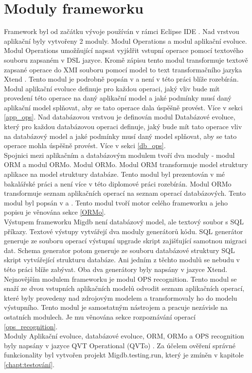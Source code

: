 \documentclass[11pt,twoside,a4paper]{book}
\begin{document}
\section{Moduly frameworku}
Framework byl od začátku vývoje používán v rámci Eclipse IDE
\cite{Eclipse_ide}. Nad vrstvou aplikační byly vytvořeny 2 moduly. Modul
Operations a modul aplikační evoluce.
% 
Modul Operations umožňující napsat vyjídřit vstupní operace pomocí textového
souboru zapsaném v DSL jazyce. Kromě zápisu tento modul transformuje textově
zapsané operace do XMI \cite{XMI} souboru pomocí model to text transformačního
jazyka Xtend \cite{Xtend}. Tento modul je podrobně popsán v
\cite{Mazanec} a není v této práci blíže rozebírán.
% 
Modul aplikační evoluce definuje pro každou operaci, jaký vliv bude mít
provedení této operace na daný aplikační model a jaké podmínky musí daný
aplikační model splňovat, aby se tato operace dala úspěšně provést. Více v
sekci \ref{app_ops}.
% 
Nad databázovou vrstvou je definován modul Databázové evoluce, který pro
každou databázovou operaci definuje, jaký bude mít tato operace vliv na databázový
model a jaké podmínky musí daný model splňovat, aby se tato operace mohla
úspěšně provést. Více v sekci \ref{db_ops}.\\
% 
Spojnici mezi aplikačním a databázovým modulem tvoří dva moduly - modul ORM a
modul ORMo. Modul ORMo.
% 
Modul ORM transformuje model struktury aplikace na model struktury databáze.
Tento modul byl prezentován v mé bakalářské práci \cite{Lukes} a není více v
této diplomové práci rozebírán.
% 
Modul ORMo transformuje seznam aplikačních operací na seznam operací
databázových. Tento modul byl popsán v \cite{Jezek} a \cite{Tarant_bp}. Tento
modul tvoří motor celého frameworku a jeho popisu je věnována sekce \ref{ORMo}.\\
% 
Výstupem frameworku Migdb není databázový model, ale textový soubor s SQL
příkazy. Textové výstupy vytvářejí dva moduly generátorů kódu. SQL generátor
generuje ze souboru operací výstupní upgrade skript zajišťující samotnou migraci
dat. Schema generator potom generuje ze souboru databázové struktury SQL skript
vytvářející strukturu databáze. Ani jedním z těchto modulů se nebudu v této
práci blíže zabývat. Oba dva generátory byly napsány v jazyce Xtend.\\
%
Nejnovějším modulem frameworku je modul OPS recognition. Tento modul se
snaží ze dvou vstupních aplikačních modelů odvodit seznam aplikačních operací,
které byly provedeny nad zdrojovým modelem a transformovaly ho do modelu
výstupního. Tento modul je samostatným nástrojem a pracuje nezávisle na
ostatních modulech. Je mu věnována sekce rozpoznávání operací
\ref{ops_recognition}. \\
%
Moduly Aplikační evoluce, databázové evoluce, ORM, ORMo a OPS recognition byly
napsány v jazyce QVT Operational (QVTo) \cite{QVTo}.
%
Za účelem ověření správné funkcionality byl vytvořen projekt Migdb.testing.run,
který je zmíněn v kapitole \ref{chapt:testování}.
%
\end{document}
